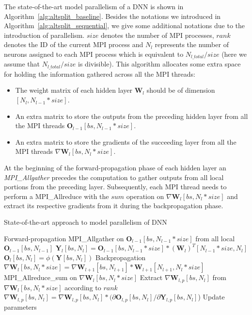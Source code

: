 The state-of-the-art model parallelism of a DNN is shown in 
Algorithm~\ref{alg:altsplit_baseline}. Besides the notations we introduced in 
Algorithm~\ref{alg:altsplit_sequential}, we give some additional notations due 
to the introduction of parallelism. $size$ denotes the number of MPI processes, 
$rank$ denotes the ID of the current MPI process and $N_l$ represents the number 
of neurons assigned to each MPI process which is equivalent to 
$N_{l\_total}/size$ (here we assume that $N_{l\_total}/size$ is divisible). This 
algorithm allocates some extra space for holding the information gathered across 
all the MPI threads: 
\begin{itemize}
    \item The weight matrix of each hidden layer $\pmb{W}_l$ should be of dimension 
        $[N_l, N_{l-1}*size]$.
    \item An extra matrix to store the outputs from the preceding hidden layer 
        from all the MPI threads $\pmb{O}_{l-1}[bs, N_{l-1}*size]$.
    \item An extra matrix to store the gradients of the succeeding layer from all 
        the MPI threads $\nabla \pmb{W}_l[bs, N_l*size]$.
\end{itemize}
At the beginning of the forward-propagation phase of each hidden layer an 
\textit{MPI\_Allgather} precedes the computation to gather outputs from all 
local portions from the preceding layer. Subsequently, each MPI thread needs to 
perform a MPI\_Allreduce with the $sum$ operation on $\nabla \pmb{W}_l[bs, 
N_l*size]$ and extract its respective gradients from it during the 
backpropagation phase.

\begin{algorithm}[H]
\caption{State-of-the-art approach to model parallelism of DNN}
\label{alg:altsplit_baseline}
{\fontsize{10}{10}\selectfont
\begin{algorithmic}[1]
    \Comment Forward-propagation 
            \State MPI\_Allgather on $\pmb{O}_{l-1}[bs, N_{l-1}*size]$ from all local $\pmb{O}_{l-1}[bs, N_{l-1}]$
            \State $\pmb{Y}_l[bs, N_l] = \pmb{O}_{l-1}[bs, N_{l-1}*size] * (\pmb{W}_{l})^T[N_{l-1}*size, N_l]$
            \State $\pmb{O}_l[bs, N_l] = \phi(\pmb{Y}[bs, N_l])$
        \EndFor
    \EndFor
    \Comment Backpropagation 
            \State $\nabla \pmb{W}_l[bs, N_l*size]  = \nabla \pmb{W}_{l+1}[bs, N_{l+1}] * \pmb{W}_{l+1}[N_{l+1}, N_l*size]$
            \State MPI\_Allreduce\_sum on  $\nabla \pmb{W}_l[bs, N_l*size]$
            \State Extract $\nabla \pmb{W}_{l,p}[bs, N_l]$ from $\nabla \pmb{W}_l[bs, N_l*size]$ according to $rank$
            \State $\nabla \pmb{W}_{l,p}[bs, N_l] = \nabla \pmb{W}_{l,p}[bs, N_l] * (\partial \pmb{O}_{l,p}[bs, N_l] / \partial \pmb{Y}_{l,p}[bs, N_l]$)
        \EndFor
    \EndFor
        \State Update parameters
    \EndFor
\end{algorithmic}}
\end{algorithm}

